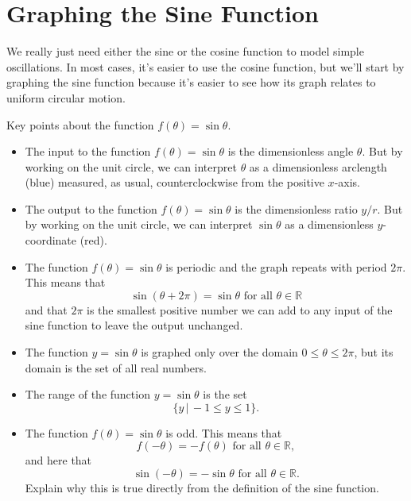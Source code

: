 \documentclass{ximera}
\begin{document}
\begin{onlineOnly}
    \begin{center}
\end{center}
\end{onlineOnly}


\section{Graphing the Sine Function}
We really just need either the sine or the cosine function to model simple oscillations. In most cases, it's easier to use the cosine function, but we'll start by graphing the sine function because it's easier to see how its graph relates to uniform circular motion.


\begin{exploration}  \label{Esdfsatnh4}

Key points about the function $f(\theta)=\sin\theta$.

\begin{itemize}

\item{The input to the function $f(\theta) = \sin\theta$ is the dimensionless angle $\theta$. But by working on the unit circle, we can interpret $\theta$ as a dimensionless arclength (blue) measured, as usual, counterclockwise from the positive $x$-axis.} 

\item{The output to the function $f(\theta) = \sin\theta$ is the dimensionless ratio $y/r$. But by working on the unit circle, we can interpret $\sin\theta$ as a dimensionless $y$-coordinate (red).}

\item{The function $f(\theta) = \sin\theta$ is periodic and the graph repeats with period $2\pi$. This means that 
\[
   \sin (\theta + 2\pi) = \sin \theta \text{ for all } \theta \in \mathbb{R}  
\]
and that $2\pi$ is the smallest positive number we can add to any input of the sine function to leave the output unchanged.}

\item{The function $y=\sin \theta$ is graphed only over the domain $0\leq \theta \leq 2\pi$, but its domain is the set of all real numbers.} 

\item{The range of the function $y=\sin\theta$ is the set
\[
     \{  y \, | \, -1\leq y \leq 1 \}.
\]}

\item{The function $f(\theta) = \sin\theta$ is odd. This means that 
\[
   f(-\theta) = - f(\theta) \text{ for all } \theta \in \mathbb{R} ,
\]
and here that 
\[
    \sin (-\theta) = - \sin \theta \text{ for all } \theta \in \mathbb{R} .
\]
Explain why this is true directly from the definition of the sine function.
}
\end{itemize}



\end{exploration}
\end{document}
